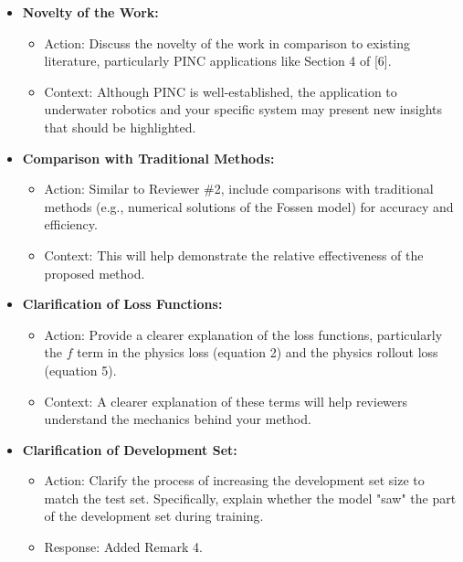 \documentclass{article}
\begin{document}
\begin{itemize}
    \item \textbf{Novelty of the Work:} 
    \begin{itemize}
        \item Action: Discuss the novelty of the work in comparison to existing literature, particularly PINC applications like Section 4 of [6].
        \item Context: Although PINC is well-established, the application to underwater robotics and your specific system may present new insights that should be highlighted.
    \end{itemize}
    
    \item \textbf{Comparison with Traditional Methods:} 
    \begin{itemize}
        \item Action: Similar to Reviewer \#2, include comparisons with traditional methods (e.g., numerical solutions of the Fossen model) for accuracy and efficiency.
        \item Context: This will help demonstrate the relative effectiveness of the proposed method.
    \end{itemize}

    \item \textbf{Clarification of Loss Functions:} 
    \begin{itemize}
        \item Action: Provide a clearer explanation of the loss functions, particularly the $f$ term in the physics loss (equation 2) and the physics rollout loss (equation 5).        

        \item Context: A clearer explanation of these terms will help reviewers understand the mechanics behind your method.
    \end{itemize}

    \item \textbf{Clarification of Development Set:} 
    \begin{itemize}
        \item Action: Clarify the process of increasing the development set size to match the test set. Specifically, explain whether the model "saw" the part of the development set during training.
        \item Response:  Added Remark 4.
    \end{itemize}
\end{itemize}
\end{document}
